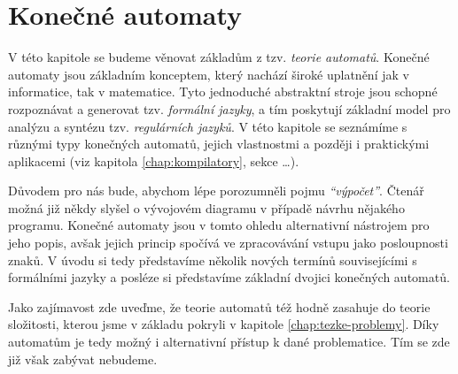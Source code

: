 \chapter{Konečné automaty}\label{chap:automaty}
V této kapitole se budeme věnovat základům z tzv. \emph{teorie automatů}. Konečné automaty jsou základním konceptem, který nachází široké uplatnění jak v informatice, tak v matematice. Tyto jednoduché abstraktní stroje jsou schopné rozpoznávat a generovat tzv. \emph{formální jazyky}, a tím poskytují základní model pro analýzu a syntézu tzv. \emph{regulárních jazyků}. V této kapitole se seznámíme s různými typy konečných automatů, jejich vlastnostmi a později i praktickými aplikacemi (viz kapitola \ref{chap:kompilatory}, sekce \dots).

Důvodem pro nás bude, abychom lépe porozumněli pojmu \emph{``výpočet''}. Čtenář možná již někdy slyšel o vývojovém diagramu v případě návrhu nějakého programu. Konečné automaty jsou v tomto ohledu alternativní nástrojem pro jeho popis, avšak jejich princip spočívá ve zpracovávání vstupu jako posloupnosti znaků. V úvodu si tedy představíme několik nových termínů souvisejícími s formálními jazyky a posléze si představíme základní dvojici konečných automatů.

Jako zajímavost zde uveďme, že teorie automatů též hodně zasahuje do teorie složitosti, kterou jsme v základu pokryli v kapitole \ref{chap:tezke-problemy}. Díky automatům je tedy možný i alternativní přístup k dané problematice. Tím se zde již však zabývat nebudeme.



